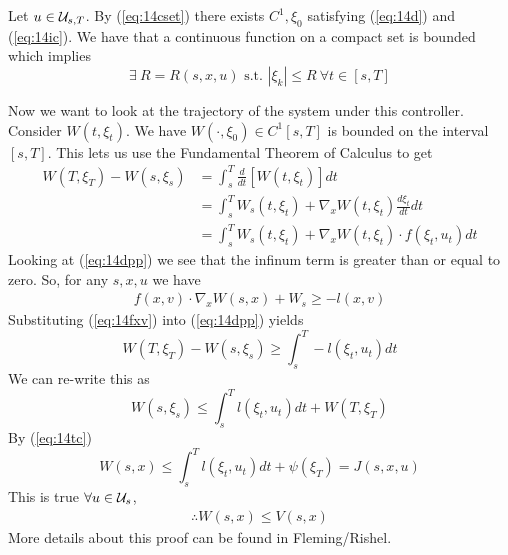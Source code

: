Let $u\in\mathcal{U}_{s,T}$.
By (\ref{eq:14cset}) there exists $C^1, \xi_0$ satisfying (\ref{eq:14d}) and (\ref{eq:14ic}).
We have that a continuous function on a compact set is bounded which implies
$$\exists~R=R(s,x,u) \text{~s.t.~} |\xi_k|\leq R~\forall t\in[s,T]$$

Now we want to look at the trajectory of the system under this controller.
Consider $W(t,\xi_t)$.
We have $W(\cdot,\xi_0)\in C^1[s,T]$ is bounded on the interval $[s,T]$.
This lets us use the Fundamental Theorem of Calculus to get
\begin{align*}
W(T,\xi_T) - W(s,\xi_s) &= \int_s^T \frac{d}{dt}[W(t,\xi_t)]dt \\
&= \int_s^T W_s(t,\xi_t) + \nabla_x W(t,\xi_t) \frac{d\xi_t}{dt}dt \\
&= \int_s^T W_s(t,\xi_t) + \nabla_x W(t,\xi_t)\cdot f(\xi_t,u_t)dt
\end{align*}
Looking at (\ref{eq:14dpp}) we see that the infinum term is greater than or equal to zero.
So, for any $s,x,u$ we have
\begin{align}
\label{eq:14fxv}
f(x,v)\cdot\nabla_x W(s,x)+W_s \geq -l(x,v)
\end{align}
Substituting (\ref{eq:14fxv}) into (\ref{eq:14dpp}) yields
$$W(T,\xi_T) - W(s,\xi_s) \geq \int_s^T -l(\xi_t,u_t)dt$$
We can re-write this as
$$W(s,\xi_s) \leq \int_s^T l(\xi_t,u_t)dt + W(T,\xi_T)$$
By (\ref{eq:14tc})
$$W(s,x) \leq \int_s^T l(\xi_t,u_t)dt + \psi(\xi_T) = J(s,x,u)$$
This is true $\forall u\in\mathcal{U}_s$,
\begin{align}
\label{eq:14wv}
\therefore W(s,x) \leq V(s,x)
\end{align}
More details about this proof can be found in Fleming/Rishel.

